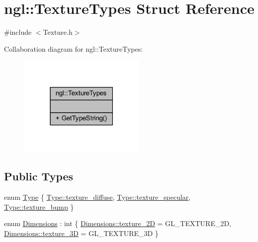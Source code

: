 \hypertarget{structngl_1_1_texture_types}{}\section{ngl\+:\+:Texture\+Types Struct Reference}
\label{structngl_1_1_texture_types}


{\ttfamily \#include $<$Texture.\+h$>$}



Collaboration diagram for ngl\+:\+:Texture\+Types\+:
\nopagebreak
\begin{figure}[H]
\begin{center}
\leavevmode
\includegraphics[width=174pt]{structngl_1_1_texture_types__coll__graph}
\end{center}
\end{figure}
\subsection*{Public Types}
\begin{DoxyCompactItemize}
\item 
enum \mbox{\hyperlink{structngl_1_1_texture_types_a1e2e79adc39e35979a635bfc6fd37d54}{Type}} \{ \mbox{\hyperlink{structngl_1_1_texture_types_a1e2e79adc39e35979a635bfc6fd37d54a14537624b53e4f7ea1ed6da9d69689bd}{Type\+::texture\+\_\+diffuse}}, 
\mbox{\hyperlink{structngl_1_1_texture_types_a1e2e79adc39e35979a635bfc6fd37d54a15de69baae1c21be50ddee302cc11949}{Type\+::texture\+\_\+specular}}, 
\mbox{\hyperlink{structngl_1_1_texture_types_a1e2e79adc39e35979a635bfc6fd37d54a700e2ecc89c80e856d64e370ea3f13af}{Type\+::texture\+\_\+bump}}
 \}
\item 
enum \mbox{\hyperlink{structngl_1_1_texture_types_a83a45c404d98265ef92b45a6a86c479b}{Dimensions}} \+: int \{ \mbox{\hyperlink{structngl_1_1_texture_types_a83a45c404d98265ef92b45a6a86c479baf0108ea0594413a08d9ec573b6d7dfe4}{Dimensions\+::texture\+\_\+2D}} = G\+L\+\_\+\+T\+E\+X\+T\+U\+R\+E\+\_\+2D, 
\mbox{\hyperlink{structngl_1_1_texture_types_a83a45c404d98265ef92b45a6a86c479ba276d2570f9586e611390e80162e19d81}{Dimensions\+::texture\+\_\+3D}} = G\+L\+\_\+\+T\+E\+X\+T\+U\+R\+E\+\_\+3D
 \}
\end{DoxyCompactItemize}
